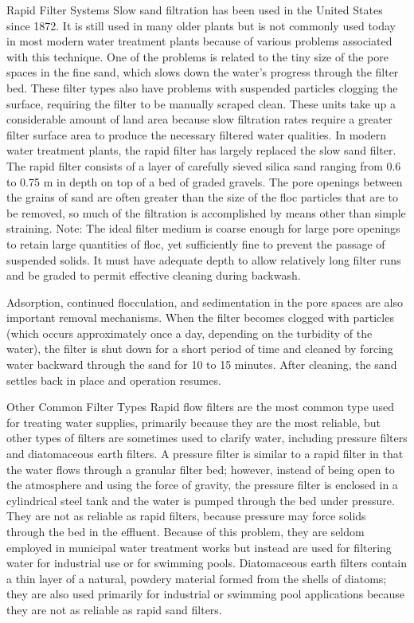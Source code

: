 \documentclass{article}
\begin{document}
Rapid Filter Systems Slow sand filtration has been used in the United
States since 1872. It is still used in many older plants but is not
commonly used today in most modern water treatment plants because of
various problems associated with this technique. One of the problems is
related to the tiny size of the pore spaces in the fine sand, which
slows down the water's progress through the filter bed. These filter
types also have problems with suspended particles clogging the surface,
requiring the filter to be manually scraped clean. These units take up a
considerable amount of land area because slow filtration rates require a
greater filter surface area to produce the necessary filtered water
qualities. In modern water treatment plants, the rapid filter has
largely replaced the slow sand filter. The rapid filter consists of a
layer of carefully sieved silica sand ranging from 0.6 to 0.75 m in
depth on top of a bed of graded gravels. The pore openings between the
grains of sand are often greater than the size of the floc particles
that are to be removed, so much of the filtration is accomplished by
means other than simple straining. Note: The ideal filter medium is
coarse enough for large pore openings to retain large quantities of
floc, yet sufficiently fine to prevent the passage of suspended solids.
It must have adequate depth to allow relatively long filter runs and be
graded to permit effective cleaning during backwash.

Adsorption, continued flocculation, and sedimentation in the pore spaces
are also important removal mechanisms. When the filter becomes clogged
with particles (which occurs approximately once a day, depending on the
turbidity of the water), the filter is shut down for a short period of
time and cleaned by forcing water backward through the sand for 10 to 15
minutes. After cleaning, the sand settles back in place and operation
resumes.

Other Common Filter Types Rapid flow filters are the most common type
used for treating water supplies, primarily because they are the most
reliable, but other types of filters are sometimes used to clarify
water, including pressure filters and diatomaceous earth filters. A
pressure filter is similar to a rapid filter in that the water flows
through a granular filter bed; however, instead of being open to the
atmosphere and using the force of gravity, the pressure filter is
enclosed in a cylindrical steel tank and the water is pumped through the
bed under pressure. They are not as reliable as rapid filters, because
pressure may force solids through the bed in the effluent. Because of
this problem, they are seldom employed in municipal water treatment
works but instead are used for filtering water for industrial use or for
swimming pools. Diatomaceous earth filters contain a thin layer of a
natural, powdery material formed from the shells of diatoms; they are
also used primarily for industrial or swimming pool applications because
they are not as reliable as rapid sand filters.
\end{document}
